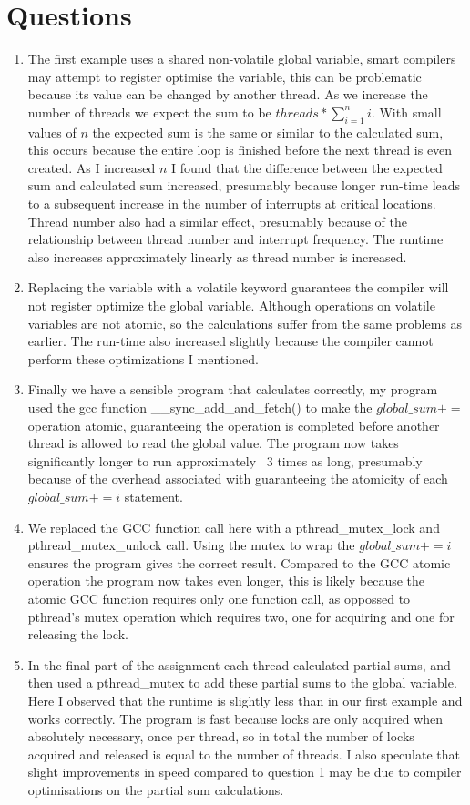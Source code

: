 \documentclass[12pt]{article}
\begin{document}
\section{Questions} 
\begin{enumerate}
\item The first example uses a shared non-volatile global variable, smart compilers may attempt to register optimise the variable, this can be problematic because its
    value can be changed by another thread. As we increase the number of threads we expect the sum to be $ threads * \sum_{i=1}^{n} i$. With small values of $ n $
    the expected sum is the same or similar to the calculated sum, this occurs because the entire loop is finished before the next thread is even created. As I increased $ n $ I found that the difference between the expected sum and calculated sum increased, presumably because longer run-time leads to a subsequent increase in the number of interrupts at critical locations. Thread number also had a similar effect, presumably because of the relationship between thread number and interrupt frequency. The runtime also increases approximately linearly as thread number is increased. 
    
\item Replacing the variable with a volatile keyword guarantees the compiler will not register optimize the global variable. Although operations on volatile variables are not atomic, so the calculations suffer from the same problems as earlier. The run-time also increased slightly because the compiler cannot perform these optimizations I mentioned. 
\item
    Finally we have a sensible program that calculates correctly, my program used the gcc function \_\_sync\_add\_and\_fetch() to make the $ global\_sum +=  $ operation atomic, guaranteeing the operation is completed before another thread is allowed to read the global value. The program now takes significantly longer to run approximately ~3 times as long, presumably because of the overhead associated with guaranteeing the atomicity of each $ global\_sum += i $ statement. 
\item 
    We replaced the GCC function call here with a pthread\_mutex\_lock and pthread\_mutex\_unlock call. Using the mutex to wrap the $ global\_sum += i $ ensures the program gives the correct result. Compared to the GCC atomic operation the program now takes even longer, this is likely because the atomic GCC function requires only one function call, as oppossed to pthread's mutex operation which requires two, one for acquiring and one for releasing the lock.  
\item
    In the final part of the assignment each thread calculated partial sums, and then used a pthread\_mutex to add these partial sums to the global variable. Here I observed that the runtime is slightly less than in our first example and works correctly. The program is fast because locks are only acquired when absolutely necessary, once per thread, so in total the number of locks acquired and released is equal to the number of threads. I also speculate that slight improvements in speed compared to question 1 may be due to compiler optimisations on the partial sum calculations.  
            
\end{enumerate} 
\end{document}
